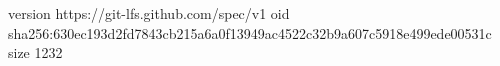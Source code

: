 version https://git-lfs.github.com/spec/v1
oid sha256:630ec193d2fd7843cb215a6a0f13949ac4522c32b9a607c5918e499ede00531c
size 1232
